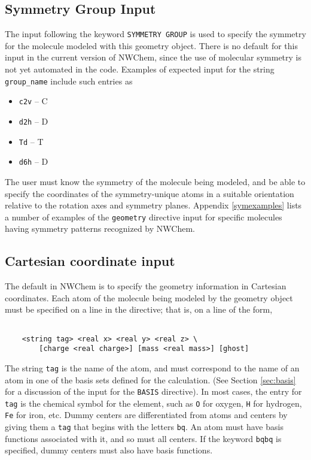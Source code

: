 \subsection{Symmetry Group Input}

The input following the keyword \verb+SYMMETRY GROUP+ is used to specify
the symmetry for the molecule modeled with this geometry object.
There is no default for this input in the current version of NWChem, since
the use of molecular symmetry is not yet automated in the code.
Examples of expected input for the string \verb+group_name+ include
such entries as

\begin{itemize}
\item \verb+c2v+ -- C
\item \verb+d2h+ -- D
\item \verb+Td+ -- T
\item \verb+d6h+ -- D
\end{itemize}

The user must know the symmetry of the molecule being modeled, and be able
to specify the
coordinates of the symmetry-unique atoms in a suitable orientation
relative to the rotation axes and symmetry planes.  
Appendix \ref{symexamples} lists a number of examples of the \verb+geometry+
directive input for specific molecules having symmetry patterns recognized
by NWChem.

\subsection{Cartesian coordinate input}
\label{sec:cart}

The default in NWChem is to specify the geometry information in Cartesian 
coordinates.  Each atom of the molecule being modeled by the geometry
object must be specified on a line in the directive; that is, on a line of
the form,

\begin{verbatim}

    <string tag> <real x> <real y> <real z> \
        [charge <real charge>] [mass <real mass>] [ghost]

\end{verbatim}

The string \verb+tag+ is the name of the atom, and must correspond to the
name of an atom in one of the basis sets defined for the calculation. 
(See Section \ref{sec:basis} for a discussion of the input for the
\verb+BASIS+ directive).  In most cases, the entry for \verb+tag+ is the
chemical symbol for the element, such as \verb+O+ for oxygen, \verb+H+
for hydrogen, \verb+Fe+ for iron, etc.  Dummy centers 
are differentiated from atoms and centers by giving them a \verb+tag+ that 
begins with the letters \verb+bq+.  An atom must have basis functions
associated with it, and so must all centers.  If the keyword \verb+bqbq+
is specified, dummy centers must also have basis functions.

